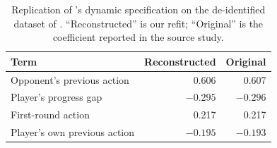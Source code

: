\documentclass[sigconf,anonymous]{aamas}
\begin{document}
\begin{table}[h]
    \caption{Replication of \citet{falling_behind_unsafe}'s dynamic
    specification on the de-identified dataset of
    \citet{falling_behind_unsafe}. ``Reconstructed''
    is our refit; ``Original'' is the coefficient reported in the source
    study.}
    \label{tab:human-replication}
    \centering
    \small
    \begin{tabular}{@{}lrr@{}}
        \toprule
        Term & Reconstructed & Original \\
        \midrule
        Opponent's previous action & 0.606  & 0.607  \\
        Player's progress gap      & $-0.295$ & $-0.296$ \\
        First-round action         & 0.217  & 0.217  \\
        Player's own previous action & $-0.195$ & $-0.193$ \\
        \bottomrule
    \end{tabular}
\end{table}
\end{document}
